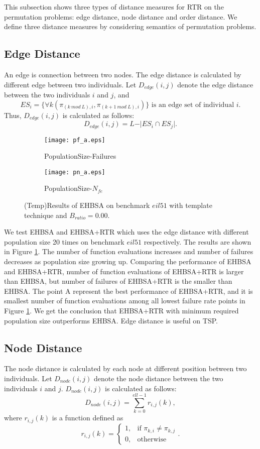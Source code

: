 This subsection shows three types of distance measures for RTR on the permutation problems: edge distance, node distance and order distance. We define three distance measures by considering semantics of permutation problems.
\subsection*{Edge Distance}


An edge is connection between two nodes. The edge distance is calculated by different edge between two individuals. Let $D_{edge} (i,j)$ denote the edge distance between the two individuals $i$ and $j$, and \[ES_i=\lbrace\forall k(\pi_{(k\ mod\ L),i}, \pi_{(k+1\ mod\ L),i})\rbrace\mbox{ is an edge set of individual }i.\] Thus, $D_{edge} (i,j)$ is calculated as follows:\[D_{edge} (i,j)=L-\vert ES_i\cap ES_j\vert.\]

\begin{figure}[htbp] 
        \centering
        \begin{subfigure}{0.49\textwidth}
            \texttt{[image: pf\_a.eps]}
            \caption{PopulationSize-Failures} 
        \end{subfigure}
        \begin{subfigure}{0.49\textwidth} 
            \texttt{[image: pn\_a.eps]}
            \caption{PopulationSize-$N_{fe}$}
        \end{subfigure}

        \caption{(Temp)Results of EHBSA on benchmark $eil51$ with template technique and $B_{ratio}=0.00$.  } 
        \label{fig:ehbsa_pf}
\end{figure}

We test EHBSA and EHBSA+RTR which uses the edge distance with different population size 20 times on benchmark $eil51$ respectively. The results are shown in Figure \ref{fig:ehbsa_pf}. The number of function evaluations increases and number of failures decreases as population size growing up. Comparing the performance of EHBSA and EHBSA+RTR, number of function evaluations of EHBSA+RTR is larger than EHBSA, but number of failures of EHBSA+RTR is the smaller than EHBSA. The point A represent the best performance of EHBSA+RTR, and it is smallest number of function evaluations among all lowest failure rate points in Figure \ref{fig:ehbsa_pf}. We get the conclusion that EHBSA+RTR with minimum required population size outperforms EHBSA. Edge distance is useful on TSP.

\subsection*{Node Distance}
The node distance is calculated by each node at different position between two individuals. Let $D_{node} (i,j)$ denote the node distance between the two individuals $i$ and $j$. $D_{node} (i,j)$ is calculated as follows:\[D_{node} (i,j)=\sum_{k=0}^{ell-1} r_{i,j} (k), \]
where $r_{i,j} (k)$ is a function defined as \[r_{i,j} (k)=
\begin{cases}
1,  & \mbox{if }\pi_{k,i}\neq \pi_{k,j} \\
0, & \mbox{otherwise}
\end{cases}
.\]


